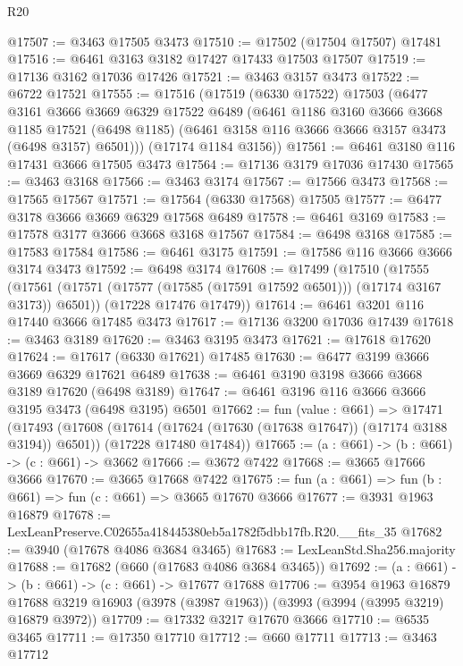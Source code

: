 \begin{lexlean}{R20}
\begin{coremodule}
@17507 := @3463 @17505 @3473
@17510 := @17502 (@17504 @17507) @17481
@17516 := @6461 @3163 @3182 @17427 @17433 @17503 @17507
@17519 := @17136 @3162 @17036 @17426
@17521 := @3463 @3157 @3473
@17522 := @6722 @17521
@17555 := @17516
    (@17519
      (@6330 @17522)
      @17503
      (@6477
        @3161
        @3666
        @3669
        @6329
        @17522
        @6489
        (@6461
          @1186
          @3160
          @3666
          @3668
          @1185
          @17521
          (@6498 @1185)
          (@6461 @3158 @116 @3666 @3666 @3157 @3473 (@6498 @3157) @6501)))
      (@17174 @1184 @3156))
@17561 := @6461 @3180 @116 @17431 @3666 @17505 @3473
@17564 := @17136 @3179 @17036 @17430
@17565 := @3463 @3168
@17566 := @3463 @3174
@17567 := @17566 @3473
@17568 := @17565 @17567
@17571 := @17564 (@6330 @17568) @17505
@17577 := @6477 @3178 @3666 @3669 @6329 @17568 @6489
@17578 := @6461 @3169
@17583 := @17578 @3177 @3666 @3668 @3168 @17567
@17584 := @6498 @3168
@17585 := @17583 @17584
@17586 := @6461 @3175
@17591 := @17586 @116 @3666 @3666 @3174 @3473
@17592 := @6498 @3174
@17608 := @17499
    (@17510
      (@17555 (@17561 (@17571 (@17577 (@17585 (@17591 @17592 @6501))) (@17174 @3167 @3173)) @6501))
      (@17228 @17476 @17479))
@17614 := @6461 @3201 @116 @17440 @3666 @17485 @3473
@17617 := @17136 @3200 @17036 @17439
@17618 := @3463 @3189
@17620 := @3463 @3195 @3473
@17621 := @17618 @17620
@17624 := @17617 (@6330 @17621) @17485
@17630 := @6477 @3199 @3666 @3669 @6329 @17621 @6489
@17638 := @6461 @3190 @3198 @3666 @3668 @3189 @17620 (@6498 @3189)
@17647 := @6461 @3196 @116 @3666 @3666 @3195 @3473 (@6498 @3195) @6501
@17662 := fun (value : @661) =>
  @17471
    (@17493
      (@17608 (@17614 (@17624 (@17630 (@17638 @17647)) (@17174 @3188 @3194)) @6501))
      (@17228 @17480 @17484))
@17665 := (a : @661) -> (b : @661) -> (c : @661) -> @3662
@17666 := @3672 @7422
@17668 := @3665 @17666 @3666
@17670 := @3665 @17668 @7422
@17675 := fun (a : @661) => fun (b : @661) => fun (c : @661) => @3665 @17670 @3666
@17677 := @3931 @1963 @16879
@17678 := LexLeanPreserve.C02655a418445380eb5a1782f5dbb17fb.R20.__fits_35
@17682 := @3940 (@17678 @4086 @3684 @3465)
@17683 := LexLeanStd.Sha256.majority
@17688 := @17682 (@660 (@17683 @4086 @3684 @3465))
@17692 := (a : @661) -> (b : @661) -> (c : @661) -> @17677 @17688
@17706 := @3954
    @1963
    @16879
    @17688
    @3219
    @16903
    (@3978 (@3987 @1963))
    (@3993 (@3994 (@3995 @3219) @16879 @3972))
@17709 := @17332 @3217 @17670 @3666
@17710 := @6535 @3465
@17711 := @17350 @17710
@17712 := @660 @17711
@17713 := @3463 @17712

\end{coremodule}
\end{lexlean}
